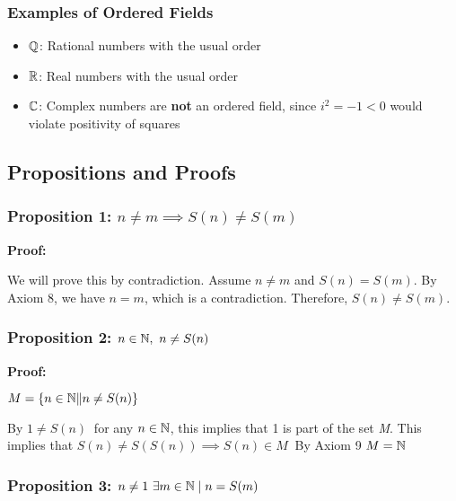\subsubsection{Examples of Ordered Fields}

\begin{itemize}

	\item \( \mathbb{Q} \): Rational numbers with the usual order

	\item \( \mathbb{R} \): Real numbers with the usual order

	\item \( \mathbb{C} \): Complex numbers are \textbf{not} an ordered field, since \( i^2 = -1 < 0 \) 
	      would violate positivity of squares

\end{itemize}

\subsection{Propositions and Proofs}

\subsubsection{Proposition 1: \texorpdfstring{\(n \ne m \implies S(n) \ne S(m)\)}{n!= m implies S (n)!=S (m)}}

\textbf{Proof:} 

We will prove this by contradiction. Assume \( n \ne m \) and \( S(n) = S(m) \). 
By Axiom 8, we have \( n = m \), which is a contradiction. Therefore, \( S(n) \ne S(m) \).

\subsubsection{Proposition 2: \texorpdfstring{ \(n \in \mathbb{N},\ n \ne S(n)\)}{ For any n in N, n!= S (n)}}

\textbf{Proof:} 

\(M = \{n \in \Naturals \| n \ne S(n) \}\ \)

By \(1 \ne S(n)\ \) for any \(n \in \mathbb{N}\), this implies that 1 is part of the set \emph{M}. 
This implies that \(S(n) \ne S(S(n)) \implies S(n) \in M\ \) By Axiom 9 \(M = \mathbb{N}\)

\subsubsection{Proposition 3: \texorpdfstring{\(n \ne 1\ \exists m \in \mathbb{N} \mid n = S(m)\)}{n!= 1, exists m in N | n = S (m)}}

